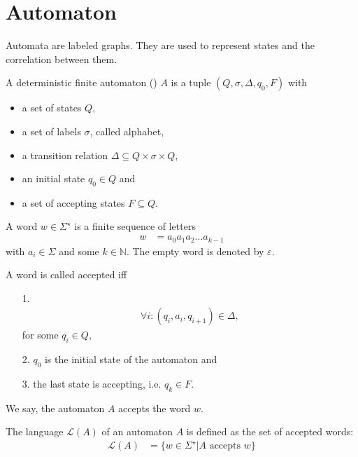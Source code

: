 \section{Automaton}\label{automaton_sec}
	Automata are labeled graphs. They are used to represent states and the correlation between them.
	\begin{mydef}\label{automaton}
		A \textnormal{deterministic finite automaton} (\dfa) $A$ is a tuple $(Q, \sigma, \Delta, q_0, F)$ with
		\begin{itemize}
			\item a set of states $Q$,
			\item a set of labels $\sigma$, called \textnormal{alphabet},
			\item a transition relation $\Delta \subseteq Q \times \sigma \times Q$,
			\item an initial state $q_0 \in Q$ and
			\item a set of accepting states $F \subseteq Q$.
		\end{itemize}
	\end{mydef}
	\begin{mydef}
		A \textnormal{word} $w \in \Sigma^{\star}$ is a finite sequence of letters
		\begin{align*}
			w	&= a_0a_1a_2 \ldots a_{k - 1}
		\end{align*}
		with $a_i \in \Sigma$ and some $k \in \mathbb{N}$. The empty word is denoted by $\varepsilon$.
		
		A word is called \textnormal{accepted} iff
		\begin{itemize}
			\item[1.] \begin{align*}
					\forall i: (q_i, a_i, q_{i + 1}) \in \Delta,
				\end{align*}
				for some $q_i \in Q$,
			\item[2.] $q_0$ is the initial state of the automaton and
			\item[3.] the last state is accepting, i.e. $q_k \in F$.
		\end{itemize}
		We say, the automaton $A$ accepts the word $w$.
	\end{mydef}
	\begin{mydef}
		The language $\mathcal{L}(A)$ of an automaton $A$ is defined as the set of accepted words:
		\begin{align*}
			\mathcal{L}(A)	&= \{w \in \Sigma^{\star} | A \text{ accepts } w\}
		\end{align*}
	\end{mydef}\quad\\
